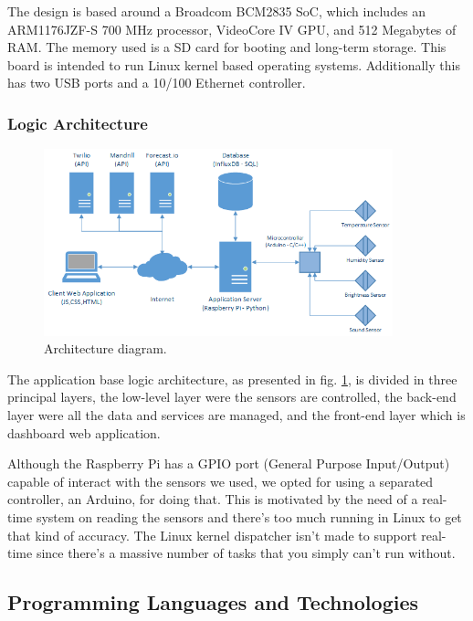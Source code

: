 \documentclass[12pt]{report}
\begin{document}
The design is based around a Broadcom BCM2835 SoC, which includes an ARM1176JZF-S 700 MHz processor, VideoCore IV GPU, and 512 Megabytes of RAM. The memory used is a SD card for booting and long-term storage. This board is intended to run Linux kernel based operating systems. Additionally this has two USB ports and a 10/100 Ethernet controller.

\subsubsection{Logic Architecture}

\begin{figure}[H]
    \centering
    \includegraphics[width=0.9\textwidth]{img/arc.png}
    \caption{Architecture diagram.}
    \label{fig:arc}
\end{figure}

The application base logic architecture, as presented in fig. \ref{fig:arc}, is divided in three principal layers, the low-level layer were the sensors are controlled, the back-end layer were all the data and services are managed, and the front-end layer which is dashboard web application.

Although the Raspberry Pi has a GPIO port (General Purpose Input/Output) capable of interact with the sensors we used, we opted for using a separated controller, an Arduino, for doing that. This is motivated by the need of a real-time system on reading the sensors and there's too much running in Linux to get that kind of accuracy. The Linux kernel dispatcher isn't made to support real-time since there's a massive number of tasks that you simply can't run without.

\subsection{Programming Languages and Technologies}
\end{document}
